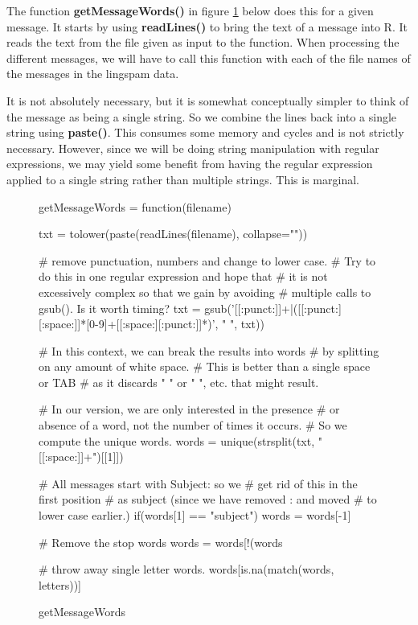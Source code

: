 \documentclass{article}
\def\SFunction#1{\textbf{#1()}}
\begin{document}
The function \SFunction{getMessageWords} in figure
\ref{fig:getMessageWords} below does this for a given message.  It
starts by using \SFunction{readLines} to bring the text of a message
into R.  It reads the text from the file given as input to the
function.  When processing the different messages, we will have to
call this function with each of the file names of the messages in the
lingspam data.

It is not absolutely necessary, but it is somewhat conceptually
simpler to think of the message as being a single string.  So we
combine the lines back into a single string using \SFunction{paste}.
This consumes some memory and cycles and is not strictly necessary.
However, since we will be doing string manipulation with regular
expressions, we may yield some benefit from having the regular
expression applied to a single string rather than multiple strings.
This is marginal.

\begin{figure}[htbp]
  \begin{center}
    \leavevmode
\begin{listing}[5]{1}
getMessageWords =
function(filename)
{
  txt = tolower(paste(readLines(filename), collapse="\n"))
   
    # remove punctuation, numbers and change to lower case.
    # Try to do this in one regular expression and hope that
    # it is not excessively complex so that we gain by avoiding
    # multiple calls to gsub(). Is it worth timing?
  txt = gsub('[[:punct:]]+|([[:punct:][:space:]]*[0-9]+[[:space:][:punct:]]*)',
             " ", txt))

    # In this context, we can break the results into words
    # by splitting on any amount of white space.
    # This is better than a single space or TAB
    # as it discards " " or "  ", etc. that might result.

    # In our version, we are only interested in the presence
    # or absence of a word, not the number of times it occurs.
    # So we compute the unique words.
  words = unique(strsplit(txt, "[[:space:]]+")[[1]])

   # All messages start with Subject: so we
   # get rid of this in the first position
   # as subject (since we have removed : and moved
   # to lower case earlier.)
  if(words[1] == "subject")
    words = words[-1]

    # Remove the stop words
  words = words[!(words %

    # throw away single letter words.
  words[is.na(match(words, letters))]
}
\end{listing}
    \caption{getMessageWords}
    \label{fig:getMessageWords}
  \end{center}
\end{figure}
\end{document}
